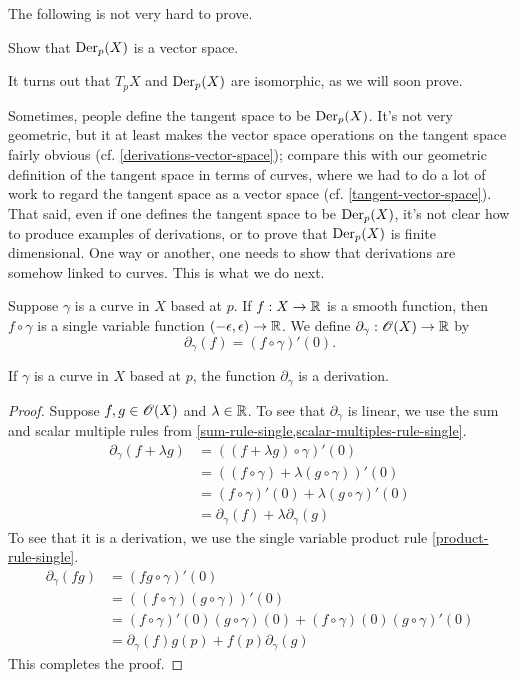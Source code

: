 The following is not very hard to prove. 

\begin{exercise} \label{derivations-vector-space}
	Show that $\operatorname{Der}_p(X)$ is a vector space. 
\end{exercise}

It turns out that $T_p X$ and $\operatorname{Der}_p(X)$ are isomorphic, as we will soon prove.

\begin{remark}
	Sometimes, people define the tangent space to be $\operatorname{Der}_p(X)$. It's not very geometric, but it at least makes the vector space operations on the tangent space fairly obvious (cf. \cref{derivations-vector-space}); compare this with our geometric definition of the tangent space in terms of curves, where we had to do a lot of work to regard the tangent space as a vector space (cf. \cref{tangent-vector-space}). That said, even if one defines the tangent space to be $\operatorname{Der}_p(X)$, it's not clear how to produce examples of derivations, or to prove that $\operatorname{Der}_p(X)$ is finite dimensional. One way or another, one needs to show that derivations are somehow linked to curves. This is what we do next. 
\end{remark}

\begin{definition}
	Suppose $\gamma$ is a curve in $X$ based at $p$. If $f : X \to \mathbb{R}$ is a smooth function, then $f \circ \gamma$ is a single variable function $(-\epsilon, \epsilon) \to \mathbb{R}$. We define $\partial_\gamma : \mathscr{O}(X) \to \mathbb{R}$ by \[ \partial_\gamma(f) = (f \circ \gamma)'(0). \]
\end{definition}

\begin{lemma}
	If $\gamma$ is a curve in $X$ based at $p$, the function $\partial_\gamma$ is a derivation. 
\end{lemma}

\begin{proof}
	Suppose $f, g \in \mathscr{O}(X)$ and $\lambda \in \mathbb{R}$. To see that $\partial_\gamma$ is linear, we use the sum and scalar multiple rules from \cref{sum-rule-single,scalar-multiples-rule-single}. 
	\[ \begin{aligned} \partial_\gamma(f + \lambda g) &= ((f + \lambda g)\circ \gamma)'(0) \\
	&= ((f \circ \gamma) + \lambda (g \circ \gamma))'(0) \\
	&= (f \circ \gamma)'(0) + \lambda (g\circ \gamma)'(0) \\
	&= \partial_\gamma(f) + \lambda \partial_\gamma(g) \end{aligned}  \]
	To see that it is a derivation, we use the single variable product rule \ref{product-rule-single}. 
	\[ \begin{aligned} \partial_\gamma(fg) &= (fg \circ \gamma)'(0) \\
	&= ((f \circ \gamma)(g \circ \gamma))'(0) \\
	&= (f \circ \gamma)'(0)(g \circ \gamma)(0) + (f \circ \gamma)(0)(g \circ \gamma)'(0) \\
	&= \partial_\gamma(f)g(p) + f(p)\partial_\gamma(g) \end{aligned} \]
	This completes the proof. 
\end{proof}


